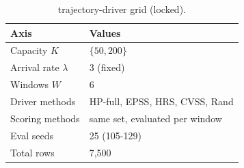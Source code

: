 \begin{table}[!t]
 \caption{trajectory-driver grid (locked).}
 \label{tab:grid}
 \centering
 \small
 \setlength{\tabcolsep}{4pt}
 \begin{tabular}{@{}p{2.5cm}p{5.0cm}@{}}
 \toprule
 \textbf{Axis} & \textbf{Values} \\
 \midrule
 Capacity $K$ & $\{50, 200\}$ \\
 Arrival rate $\lambda$ & 3 (fixed) \\
 Windows $W$ & 6 \\
 Driver methods & HP-full, EPSS, HRS, CVSS, Rand \\
 Scoring methods & same set, evaluated per window \\
 Eval seeds & 25 (105-129) \\
 \midrule
 Total rows & 7{,}500 \\
 \bottomrule
 \end{tabular}
\end{table}
